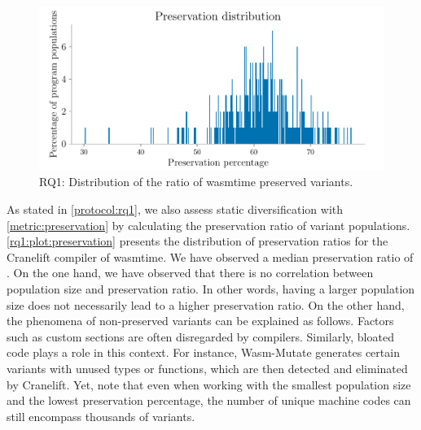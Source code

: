 \documentclass[a4paper,fleqn]{cas-dc}
\newcommand{\tool}{{\sc Wasm-Mutate}\xspace}
\begin{document}


\begin{figure}
    \centering
    \includegraphics[width=\linewidth]{plots/rq1/preservation.pdf}
    \caption{RQ1: Distribution of the ratio of wasmtime preserved variants.}
  \label{rq1:plot:preservation}
\end{figure}

As stated in \autoref{protocol:rq1}, we also assess static diversification with \autoref{metric:preservation} by calculating the preservation ratio of variant populations. 
\autoref{rq1:plot:preservation} presents the distribution of preservation ratios for the Cranelift compiler of wasmtime. 
We have observed a median preservation ratio of \preserved. 
On the one hand, we have observed that there is no correlation between population size and preservation ratio. 
In other words, having a larger population size does not necessarily lead to a higher preservation ratio.
On the other hand, the phenomena of non-preserved variants can be explained as follows. 
Factors such as custom sections are often disregarded by compilers. 
Similarly, bloated code plays a role in this context. 
For instance, \tool generates certain variants with unused types or functions, which are then detected and eliminated by Cranelift.
Yet, note that even when working with the smallest population size and the lowest preservation percentage, the number of unique machine codes can still encompass thousands of variants.

\end{document}
